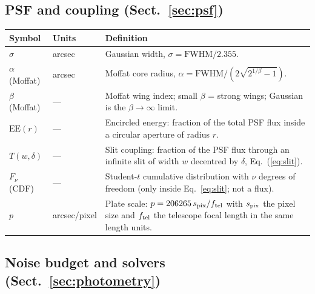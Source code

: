 \subsection*{PSF and coupling (Sect.~\ref{sec:psf})}

\begin{tabular}{llp{8.6cm}}
\toprule
Symbol & Units & Definition \\
\midrule
$\sigma$ & arcsec & Gaussian width, $\sigma = \mathrm{FWHM}/2.355$. \\
$\alpha$ (Moffat) & arcsec & Moffat core radius,
  $\alpha = \mathrm{FWHM}/(2\sqrt{2^{1/\beta}-1})$. \\
$\beta$ (Moffat) & — & Moffat wing index; small $\beta$ = strong wings;
  Gaussian is the $\beta \to \infty$ limit. \\
$\mathrm{EE}(r)$ & — & Encircled energy: fraction of the total PSF flux
  inside a circular aperture of radius $r$. \\
$T(w,\delta)$ & — & Slit coupling: fraction of the PSF flux through an
  infinite slit of width $w$ decentred by $\delta$,
  Eq.~(\ref{eq:slit}). \\
$F_\nu$ (CDF) & — & Student-$t$ cumulative distribution with $\nu$
  degrees of freedom (only inside Eq.~\ref{eq:slit}; not a flux). \\
$p$ & arcsec/pixel & Plate scale: $p = 206265\, s_{\rm pix}/f_{\rm tel}$
  with $s_{\rm pix}$ the pixel size and $f_{\rm tel}$ the telescope focal
  length in the same length units. \\
\bottomrule
\end{tabular}

\subsection*{Noise budget and solvers (Sect.~\ref{sec:photometry})}


